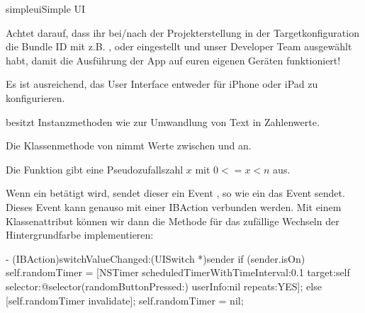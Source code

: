 \documentclass[parskip=half, final]{scrreprt}
\begin{document}
\begin{lecture}
\begin{exc}
\begin{excitem}{simpleui}{Simple UI}
\begin{exchinweise}
\item Achtet darauf, dass ihr bei/nach der Projekterstellung in der Targetkonfiguration die Bundle ID  mit  z.B. ,  oder  eingestellt und unser Developer Team ausgewählt habt, damit die Ausführung der App auf euren eigenen Geräten funktioniert!
\item Es ist ausreichend, das User Interface entweder für iPhone oder iPad zu konfigurieren.
\item {} besitzt Instanzmethoden wie  zur Umwandlung von Text in Zahlenwerte.
\item Die Klassenmethode  von  nimmt Werte zwischen  und  an.
\item Die Funktion  gibt eine Pseudozufallszahl $x$ mit $0<=x<n$ aus.
\item Wenn ein  betätigt wird, sendet dieser ein Event , so wie ein  das Event  sendet. Dieses Event kann genauso mit einer IBAction verbunden werden. Mit einem Klassenattribut  können wir dann die Methode für das zufällige Wechseln der Hintergrundfarbe implementieren:
\begin{objclst}
- (IBAction)switchValueChanged:(UISwitch *)sender {
    if (sender.isOn) {
        self.randomTimer = [NSTimer scheduledTimerWithTimeInterval:0.1 target:self selector:@selector(randomButtonPressed:) userInfo:nil repeats:YES];
    } else {
        [self.randomTimer invalidate];
        self.randomTimer = nil;
    }
}
\end{objclst}

\end{exchinweise}

\end{excitem}

\end{exc}


\end{lecture}
\end{document}
